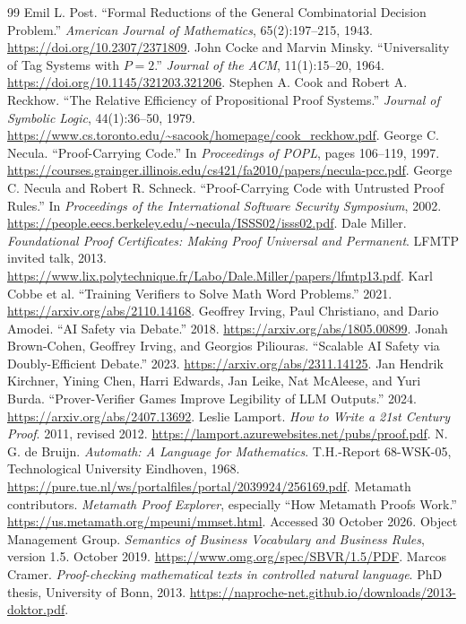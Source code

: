 \documentclass[11pt,twoside]{article}
\theoremstyle{definition}
\begin{document}
\begin{thebibliography}{99}
Emil L. Post. ``Formal Reductions of the General Combinatorial Decision
Problem.'' \emph{American Journal of Mathematics}, 65(2):197--215, 1943.
\url{https://doi.org/10.2307/2371809}.
John Cocke and Marvin Minsky. ``Universality of Tag Systems with $P=2$.''
\emph{Journal of the ACM}, 11(1):15--20, 1964.
\url{https://doi.org/10.1145/321203.321206}.
Stephen A. Cook and Robert A. Reckhow. ``The Relative Efficiency of
Propositional Proof Systems.'' \emph{Journal of Symbolic Logic}, 44(1):36--50,
1979. \url{https://www.cs.toronto.edu/~sacook/homepage/cook_reckhow.pdf}.
George C. Necula. ``Proof-Carrying Code.'' In \emph{Proceedings of POPL},
pages 106--119, 1997.
\url{https://courses.grainger.illinois.edu/cs421/fa2010/papers/necula-pcc.pdf}.
George C. Necula and Robert R. Schneck. ``Proof-Carrying Code with Untrusted
Proof Rules.'' In \emph{Proceedings of the International Software Security
Symposium}, 2002.
\url{https://people.eecs.berkeley.edu/~necula/ISSS02/isss02.pdf}.
Dale Miller. \emph{Foundational Proof Certificates: Making Proof Universal
and Permanent}. LFMTP invited talk, 2013.
\url{https://www.lix.polytechnique.fr/Labo/Dale.Miller/papers/lfmtp13.pdf}.
Karl Cobbe et al. ``Training Verifiers to Solve Math Word Problems.'' 2021.
\url{https://arxiv.org/abs/2110.14168}.
Geoffrey Irving, Paul Christiano, and Dario Amodei. ``AI Safety via Debate.''
2018. \url{https://arxiv.org/abs/1805.00899}.
Jonah Brown-Cohen, Geoffrey Irving, and Georgios Piliouras. ``Scalable AI
Safety via Doubly-Efficient Debate.'' 2023.
\url{https://arxiv.org/abs/2311.14125}.
Jan Hendrik Kirchner, Yining Chen, Harri Edwards, Jan Leike, Nat McAleese, and
Yuri Burda. ``Prover-Verifier Games Improve Legibility of LLM Outputs.'' 2024.
\url{https://arxiv.org/abs/2407.13692}.
Leslie Lamport. \emph{How to Write a 21st Century Proof}. 2011, revised 2012.
\url{https://lamport.azurewebsites.net/pubs/proof.pdf}.
N. G. de Bruijn. \emph{Automath: A Language for Mathematics}.
T.H.-Report 68-WSK-05, Technological University Eindhoven, 1968.
\url{https://pure.tue.nl/ws/portalfiles/portal/2039924/256169.pdf}.
Metamath contributors. \emph{Metamath Proof Explorer}, especially
``How Metamath Proofs Work.''
\url{https://us.metamath.org/mpeuni/mmset.html}. Accessed 30 October 2026.
Object Management Group. \emph{Semantics of Business Vocabulary and Business
Rules}, version 1.5. October 2019.
\url{https://www.omg.org/spec/SBVR/1.5/PDF}.
Marcos Cramer. \emph{Proof-checking mathematical texts in controlled natural
language}. PhD thesis, University of Bonn, 2013.
\url{https://naproche-net.github.io/downloads/2013-doktor.pdf}.
\end{thebibliography}
\end{document}
